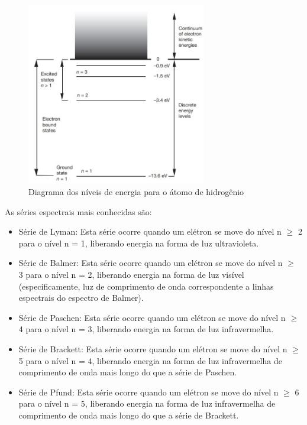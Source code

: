 \documentclass[11pt,a4paper]{article}
\begin{document}
                    \begin{figure}[h]
                        \centering
                        \includegraphics[width=0.7\textwidth]{Imagens/diagramaNiveisDeEnergiaParaOAtomoDeHidrogenio.jpg}
                        \caption{Diagrama dos níveis de energia para o átomo de hidrogênio}
                        \label{fig:diagramaNiveisDeEnergiaParaOAtomoDeHidrogenio}
                    \end{figure}

                As séries espectrais mais conhecidas são:

                \begin{itemize}

                    \item Série de Lyman: Esta série ocorre quando um elétron se move do nível n $\geqslant $ 2 para o nível n = 1, liberando energia na forma de luz ultravioleta.
                
                    \item Série de Balmer: Esta série ocorre quando um elétron se move do nível n $\geqslant $ 3 para o nível n = 2, liberando energia na forma de luz visível (especificamente, luz de comprimento de onda correspondente a linhas espectrais do espectro de Balmer).
                
                    \item Série de Paschen: Esta série ocorre quando um elétron se move do nível n $\geqslant $ 4 para o nível n = 3, liberando energia na forma de luz infravermelha.
                
                    \item Série de Brackett: Esta série ocorre quando um elétron se move do nível n $\geqslant $ 5 para o nível n = 4, liberando energia na forma de luz infravermelha de comprimento de onda mais longo do que a série de Paschen.
                
                    \item Série de Pfund: Esta série ocorre quando um elétron se move do nível n $\geqslant $ 6 para o nível n = 5, liberando energia na forma de luz infravermelha de comprimento de onda mais longo do que a série de Brackett.
                \end{itemize}
\end{document}
